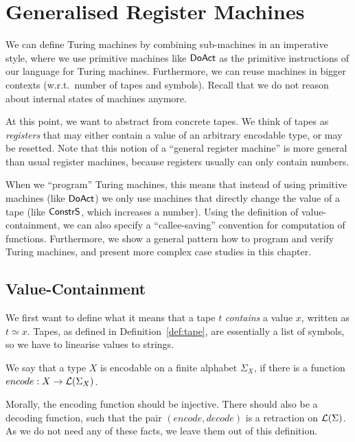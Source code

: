 \chapter{Generalised Register Machines}
\label{chap:programming}


We can define Turing machines by combining sub-machines in an imperative style, where we use primitive machines like $\mathsf{DoAct}$ as the primitive
instructions of our language for Turing machines.  Furthermore, we can reuse machines in bigger contexts (w.r.t.\ number of tapes and symbols).
Recall that we do not reason about internal states of machines anymore.

At this point, we want to abstract from concrete tapes.  We think of tapes as \textit{registers} that may either contain a value of an arbitrary
encodable type, or may be resetted.  Note that this notion of a ``general register machine'' is more general than usual register machines, because
registers usually can only contain numbers.

When we ``program'' Turing machines, this means that instead of using primitive machines (like $\mathsf{DoAct}$) we only use machines that directly change
the value of a tape (like $\mathsf{ConstrS}$, which increases a number).  Using the definition of value-containment, we can also specify a
``callee-saving'' convention for computation of functions.  Furthermore, we show a general pattern how to program and verify Turing machines, and
present more complex case studies in this chapter.


\section{Value-Containment}
\label{sec:value-containment}

We first want to define what it means that a tape $t$ \emph{contains} a value $x$, written as $t \simeq x$.  Tapes, as defined in
Definition~\ref{def:tape}, are essentially a list of symbols, so we have to linearise values to strings.

%
\begin{definition}
  \label{def:encodable}
  We say that a type $X$ is encodable on a finite alphabet $\Sigma_X$, if there is a function $encode : X \rightarrow \mathcal{L}(\Sigma_X)$.
\end{definition}

Morally, the encoding function should be injective.  There should also be a decoding function, such that the pair $(encode, decode)$ is a retraction
on $\mathcal{L}(\Sigma)$.  As we do not need any of these facts, we leave them out of this definition.

